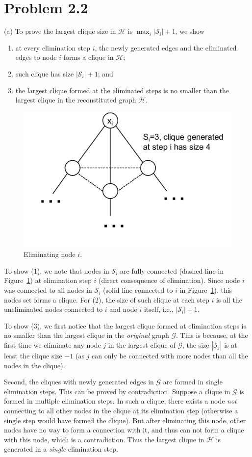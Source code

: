 \documentclass{article}
\begin{document}
 
\section*{Problem 2.2}
%
(a) To prove the largest clique size in $\mathscr{H}$ is $\max_i |\mathscr{S}_i| +1$,
we show 
\begin{enumerate}
	\item at every elimination step $i$, the newly generated edges and the eliminated edges to node $i$ forms a clique in $\mathscr{H}$;
	\item such clique has size $|\mathscr{S}_i| +1$; and
	\item the largest clique formed at the eliminated steps is no smaller than the largest clique in the reconstituted graph $\mathscr{H}$.
\end{enumerate}
%
\begin{figure}[h]
  \centering
  \includegraphics[width=0.5\columnwidth]{2a.pdf}
  \vspace{-0.7cm}
  \caption{Eliminating node $i$.}
  \label{f:2a}
\end{figure}
%

To show (1), we note that nodes in $\mathscr{S}_i$ are fully connected (dashed line in Figure~\ref{f:2a}) at elimination step $i$ (direct consequence of elimination). Since node $i$ was connected to all nodes in $\mathscr{S}_i$ (solid line connected to $i$ in Figure~\ref{f:2a}), this nodes set forms a clique.
%
For (2), the size of such clique at each step $i$ is all the uneliminated nodes connected to $i$ and node $i$ itself, i.e., $|\mathscr{S}_i| +1$.

%
To show (3), we first notice that the largest clique formed at elimination steps is no smaller than the largest clique in the \emph{original} graph $\mathscr{G}$. This is because, at the first time we eliminate any node $j$ in the largest clique of $\mathscr{G}$, the size $|\mathscr{S}_j|$ is at least the clique size $-1$ (as $j$ can only be connected with more nodes than all the nodes in the clique).

%
Second, the cliques with newly generated edges in $\mathscr{G}$ are formed in single elimination steps. This can be proved by contradiction. Suppose a clique in $\mathscr{G}$ is formed in multiple elimination steps. In such a clique, there exists a node \emph{not} connecting to all other nodes in the clique at its elimination step (otherwise a single step would have formed the clique). But after eliminating this node, other nodes have no way to form a connection with it, and thus can not form a clique with this node, which is a contradiction. Thus the largest clique in $\mathscr{H}$ is generated in a \emph{single} elimination step.
\end{document}
